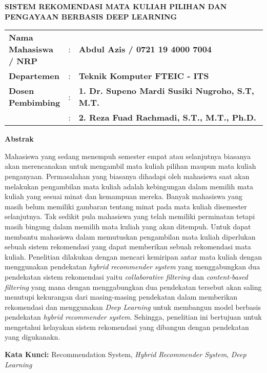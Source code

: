 {
\begin{center}
    \uppercase{\textbf{\large Sistem rekomendasi Mata Kuliah Pilihan dan Pengayaan berbasis Deep Learning}}
\end{center}

\vspace*{6 mm}
\begin{adjustwidth}{}{}
    \begin{tabular}{lcp{1\linewidth}}
        \noindent\textbf{Nama Mahasiswa / NRP} & : & \textbf{Abdul Azis / 0721 19 4000 7004}                \\
        \noindent\textbf{Departemen}           & : & \textbf{Teknik Komputer FTEIC - ITS}                   \\
        \noindent\textbf{Dosen Pembimbing}     & : & \textbf{1. Dr. Supeno Mardi Susiki Nugroho, S.T, M.T.} \\
                                               & : & \textbf{2. Reza Fuad Rachmadi, S.T., M.T., Ph.D.}      \\
    \end{tabular}
\end{adjustwidth}

\vspace{6 mm}
\noindent
\textbf{Abstrak}
\vspace{3 mm}

Mahasiswa yang sedang menempuh semester empat atau selanjutnya biasanya akan merencanakan untuk mengambil mata kuliah pilihan maupun mata kuliah penganyaan.
Permasalahan yang biasanya dihadapi oleh mahasiswa saat akan melakukan pengambilan mata kuliah adalah kebingungan dalam memilih mata kuliah yang sesuai minat dan kemampuan
mereka. Banyak mahasiswa yang masih belum memiliki gambaran tentang minat pada mata kuliah disemester selanjutnya. Tak sedikit pula mahasiswa yang telah memiliki
perminatan tetapi masih bingung dalam memilih mata kuliah yang akan ditempuh. Untuk dapat membantu mahasiswa dalam memutuskan pengambilan mata kuliah diperlukan sebuah
sistem rekomendasi yang dapat memberikan sebuah rekomendasi mata kuliah. Penelitian dilakukan dengan mencari kemiripan antar mata kuliah dengan menggunakan pendekatan \emph{hybrid recommender system} yang menggabungkan dua
pendekatan sistem rekomendasi yaitu \emph{collaborative filtering} dan \emph{content-based filtering} yang mana dengan menggabungkan dua pendekatan tersebut akan saling menutupi
kekurangan dari masing-masing pendekatan dalam memberikan rekomendasi dan menggunakan \emph{Deep Learning} untuk membangun model berbasis pendekatan \emph{hybrid recommender system}. Sehingga, penelitian ini
bertujuan untuk mengetahui kelayakan sistem rekomendasi yang dibangun dengan pendekatan yang digukanakn.

\vspace{6 mm}
\noindent
\textbf{Kata Kunci: }Recommendation System, \emph{Hybrid Recommender System}, \emph{Deep Learning}
}